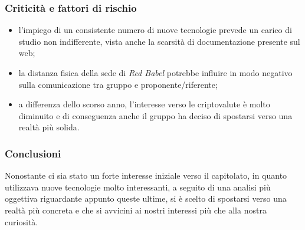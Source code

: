\subsubsection{Criticità e fattori di rischio}
\begin{itemize}
	\item l'impiego di un consistente numero di nuove tecnologie prevede un carico di studio non indifferente, vista anche la scarsità di documentazione presente sul web;	
	\item la distanza fisica della sede di \textit{Red Babel} potrebbe influire in modo negativo sulla comunicazione tra gruppo e proponente/riferente; 	
	\item a differenza dello scorso anno, l'interesse verso le criptovalute è molto diminuito e di conseguenza anche il gruppo ha deciso di spostarsi verso una realtà più solida.  
\end{itemize}

\subsubsection{Conclusioni}
Nonostante ci sia stato un forte interesse iniziale verso il capitolato, in quanto utilizzava nuove tecnologie molto interessanti, a seguito di una analisi più oggettiva riguardante appunto queste ultime, si è scelto di spostarsi verso una realtà più concreta e che si avvicini ai nostri interessi più che alla nostra curiosità.